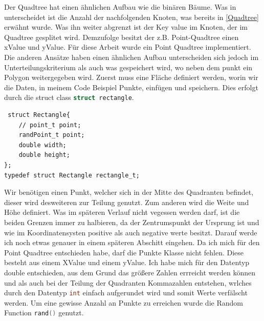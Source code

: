 \documentclass[11pt]{article}
\newcommand{\qt}{Quadtree }
\newcommand{\lstin}[1]{\lstinline[language=C]{#1}}
\begin{document}
Der \qt hat einen ähnlichen Aufbau wie die binären Bäume. Was in unterscheidet ist die Anzahl der nachfolgenden Knoten, was bereits in \ref{Quadtree} erwähnt wurde.
Was ihn weiter abgrenzt ist der Key value im Knoten, der im \qt gesplitet wird. Demzufolge besitzt der z.B. Point-\qt einen xValue und yValue. \newline
Für diese Arbeit wurde ein Point \qt implementiert. Die anderen Ansätze haben einen ähnlichen Aufbau unterscheiden sich jedoch im Unterteilungskriterium als auch was gespeichert wird, wo neben dem punkt ein Polygon weitergegeben wird.
\newline
Zuerst muss eine Fläche definiert werden, worin wir die Daten, in meinem Code Beispiel Punkte, einfügen und speichern. Dies erfolgt durch die struct class \lstin{struct rectangle}.
\begin{lstlisting}
 struct Rectangle{
    // point_t point; 
    randPoint_t point;                                                       
    double width;
    double height; 
};
typedef struct Rectangle rectangle_t;
\end{lstlisting}
Wir benötigen einen Punkt, welcher sich in der Mitte des Quadranten befindet, dieser wird desweiteren zur Teilung genutzt. Zum anderen wird die Weite und Höhe definiert. 
Was im späteren Verlauf nicht vegessen werden darf, ist die beiden Grenzen immer zu halbieren, da der Zentrumspunkt der Ursprung ist und wie im Koordinatensysten positive als auch negative werte besitzt. 
Darauf werde ich noch etwas genauer in einem späteren Abschitt eingehen. 
\newline
Da ich mich für den Point \qt entschieden habe, darf die Punkte Klasse nicht fehlen. Diese besteht aus einem XValue und einem yValue. Ich habe mich für den Datentyp double entschieden, aus dem Grund das größere Zahlen errreicht werden können und als auch bei der Teilung der Quadranten Kommazahlen entstehen, wrlches durch den Datentyp \lstin{int} einfach aufgerundet wird und somit Werte verfälscht werden. 
Um eine gewisse Anzahl an Punkte zu erreichen wurde die Random Function \lstin{rand()} genutzt.  
 
\end{document}
